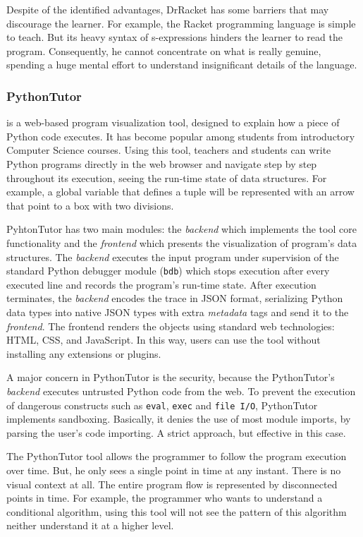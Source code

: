 Despite of the identified advantages, DrRacket has some barriers that may discourage the learner. For example, the Racket programming language is simple to teach. But its heavy syntax of s-expressions hinders the learner to read the program. Consequently, he cannot concentrate on what is really genuine, spending a huge mental effort to understand insignificant details of the language.
\subsubsection{PythonTutor~\cite{GuoSIGCSE2013}} is a web-based program visualization tool, designed to explain how a piece of Python code executes. It has become popular among students from introductory Computer Science courses. Using this tool, teachers and students can write Python programs directly in the web browser and navigate step by step throughout its execution, seeing the run-time state of data structures. For example, a global variable that defines a tuple will be represented with an arrow that point to a box with two divisions.

PyhtonTutor has two main modules: the \textit{backend} which implements the tool core functionality and the \textit{frontend} which presents the visualization of program's data structures. The \textit{backend} executes the input program under supervision of the standard Python debugger module (\texttt{bdb}) which stops execution after every executed line and records the program's run-time state. After execution terminates, the \textit{backend} encodes the trace in JSON format, serializing Python data types into native JSON types with extra \textit{metadata} tags and send it to the \textit{frontend}. The frontend renders the objects using standard web technologies: HTML, CSS, and JavaScript. In this way, users can use the tool without installing any extensions or plugins.

A major concern in PythonTutor is the security, because the PythonTutor's \textit{backend} executes untrusted Python code from the web. To prevent the execution of dangerous constructs such as {\tt eval}, {\tt exec} and {\tt file I/O}, PythonTutor implements sandboxing. Basically, it denies the use of most module imports, by parsing the user's code importing. A strict approach, but effective in this case.

The PythonTutor tool allows the programmer to follow the program execution over time. But, he only sees a single point in time at any instant. There is no visual context at all. The entire program flow is represented by disconnected points in time. For example, the programmer who wants to understand a conditional algorithm, using this tool will not see the pattern of this algorithm neither understand it at a higher level.
